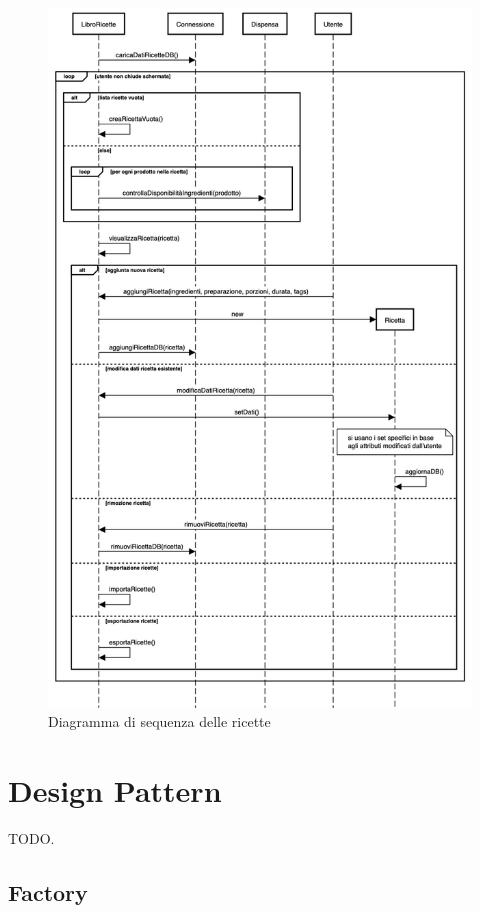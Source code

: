 \documentclass{article}
\begin{document}
\begin{figure}[H]
    \includegraphics[width=\linewidth]{images/sequence-recipe.png}
    \caption{Diagramma di sequenza delle ricette}
    \label{fig:seqrecipe}
\end{figure}

\section{Design Pattern}

TODO.

\subsection{Factory}
\end{document}
